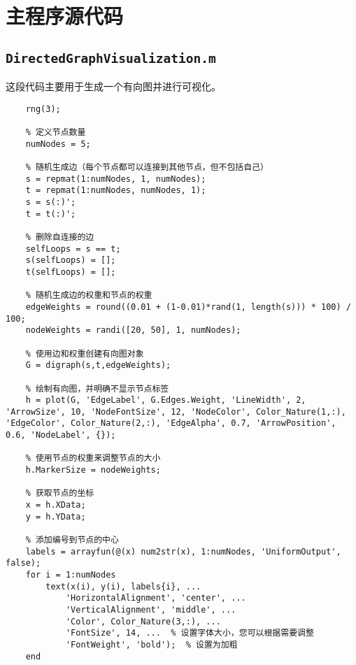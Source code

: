 
\newpage

\appendix

\section{主程序源代码}

\subsection{\texttt{DirectedGraphVisualization.m}}\label{sec A 4}
这段代码主要用于生成一个有向图并进行可视化。
\begin{lstlisting}[style=matlab,basicstyle=\footnotesize\fontspec{Courier New},title={DirectedGraphVisualization.m}]  
    % 设置随机数生成器的种子以获得可重复的结果
    rng(3);
    
    % 定义节点数量
    numNodes = 5;
    
    % 随机生成边（每个节点都可以连接到其他节点，但不包括自己）
    s = repmat(1:numNodes, 1, numNodes);
    t = repmat(1:numNodes, numNodes, 1);
    s = s(:)';
    t = t(:)';
    
    % 删除自连接的边
    selfLoops = s == t;
    s(selfLoops) = [];
    t(selfLoops) = [];
    
    % 随机生成边的权重和节点的权重
    edgeWeights = round((0.01 + (1-0.01)*rand(1, length(s))) * 100) / 100;
    nodeWeights = randi([20, 50], 1, numNodes);
    
    % 使用边和权重创建有向图对象
    G = digraph(s,t,edgeWeights);
    
    % 绘制有向图，并明确不显示节点标签
    h = plot(G, 'EdgeLabel', G.Edges.Weight, 'LineWidth', 2, 'ArrowSize', 10, 'NodeFontSize', 12, 'NodeColor', Color_Nature(1,:), 'EdgeColor', Color_Nature(2,:), 'EdgeAlpha', 0.7, 'ArrowPosition', 0.6, 'NodeLabel', {});
    
    % 使用节点的权重来调整节点的大小
    h.MarkerSize = nodeWeights;
    
    % 获取节点的坐标
    x = h.XData;
    y = h.YData;
    
    % 添加编号到节点的中心
    labels = arrayfun(@(x) num2str(x), 1:numNodes, 'UniformOutput', false);
    for i = 1:numNodes
        text(x(i), y(i), labels{i}, ...
            'HorizontalAlignment', 'center', ...
            'VerticalAlignment', 'middle', ...
            'Color', Color_Nature(3,:), ...
            'FontSize', 14, ...  % 设置字体大小，您可以根据需要调整
            'FontWeight', 'bold');  % 设置为加粗
    end

\end{lstlisting}